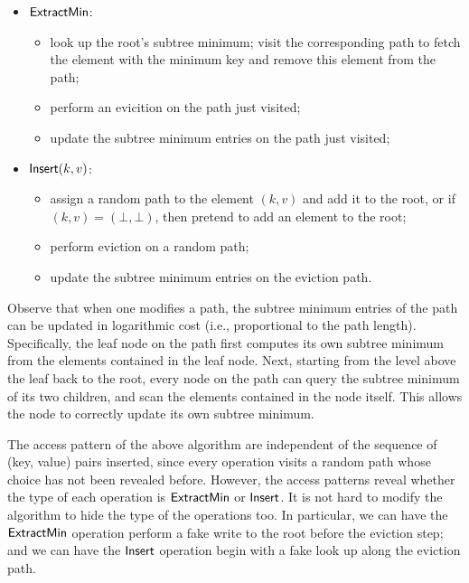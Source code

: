 \documentclass[11pt]{article}
\begin{document}
\begin{itemize}
\item 
${\sf ExtractMin}$: 
\begin{itemize}
\item 
look up the root's subtree minimum; 
visit the corresponding path
to fetch the element with the minimum key and remove this element from the path;
\item 
perform an evicition on the path just visited;
\item 
update the subtree minimum entries 
on the path just visited;
\end{itemize}
\item 
${\sf Insert}(k, v)$:
\begin{itemize}
\item 
assign a random path to the element $(k, v)$ 
and add it to the root, or if $(k, v) = (\bot, \bot)$,
then pretend to add an element to the root; 
\item 
perform eviction on a random path;
\item 
update the subtree minimum entries 
on the eviction path.
\end{itemize}
\end{itemize}
Observe that when one modifies a path, the subtree minimum entries
of the path can be updated 
in logarithmic cost (i.e., proportional to the path length).
Specifically, the leaf node on the path first computes
its own subtree minimum from the elements contained in the leaf node. 
Next, 
starting from the level above 
the leaf back to the root, 
every node 
on the path can query the subtree minimum 
of its two children, and scan the elements contained in the node itself.
This allows the node to correctly update
its own subtree minimum.

\begin{remark}
The access pattern of the above algorithm 
are independent of the 
sequence of (key, value)
pairs inserted, since every operation 
visits a random path whose choice has not been revealed before.
However, 
the access patterns reveal whether the type of each operation 
is ${\sf ExtractMin}$
or ${\sf Insert}$.
It is not hard to modify the algorithm to hide
the type of the operations too. 
In particular, we can have the  ${\sf ExtractMin}$ operation 
perform a fake write to the root before the eviction step;
and we can have the ${\sf Insert}$
operation begin with a fake look up 
along the eviction path.
\end{remark}
\end{document}
